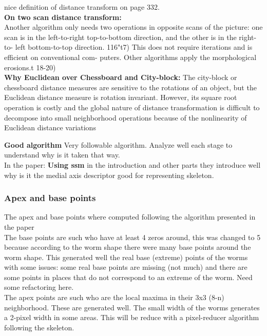 \documentclass{article}
\begin{document}
nice definition of distance transform on page 332.\\

\textbf{On two scan distance transform: }\\

Another algorithm only needs two operations in opposite scans
of the picture: one scan is in the left-to-right top-to-bottom
direction, and the other is in the right-to-
left bottom-to-top direction. 116"t7) This does not
require iterations and is efficient on conventional com-
puters. Other algorithms apply the morphological
erosions.t 18-20)\\

\textbf{Why Euclidean over Chessboard and City-block: }
The city-block or chessboard distance measures are
sensitive to the rotations of an object, but the Euclidean
distance measure is rotation invariant. However, its
square root operation is costly and the global nature
of distance transformation is difficult to decompose
into small neighborhood operations because of the
nonlinearity of Euclidean distance variations

\textbf{Good algorithm}
Very followable algorithm. Analyze well each stage to understand why is it
taken that way.\\

In the paper: \textbf{Using ssm} in the introduction and other parts they
introduce well why is it the medial axis descriptor good for representing
skeleton.\\

\subsubsection{Apex and base points}
The apex and base points where computed following the algorithm presented in the paper\\
The base points are such who have at least 4 zeros around, this was changed to 5 because
according to the worm shape there were many base points around the worm shape.
This generated well the real base (extreme) points of the worms with some issues: some
real base points are missing (not much) and there are some points in places that do not
correspond to an extreme of the worm. Need some refactoring here.
\\

The apex points are such who are the local maxima in their 3x3 (8-n) neighborhood. 
These are generated well. The small width of the worms generates a 2-pixel width
in some areas. This will be reduce with a pixel-reducer algorithm following the skeleton.
\end{document}

